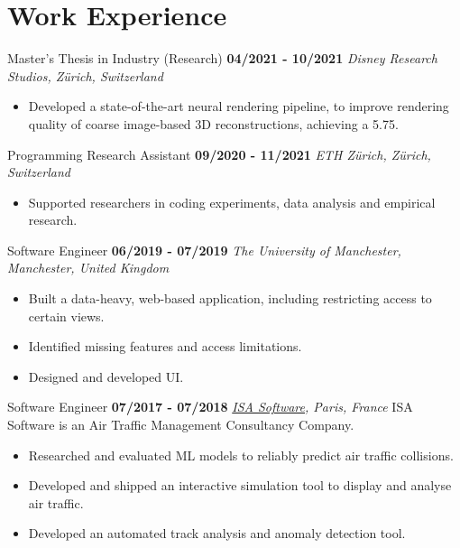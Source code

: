 \documentclass[]{friggeri-cv}
\begin{document}
\section{\color{red}Work \color{gray} Experience}
\begin{entrylist}
  \entry
    {}
    {\large{Master's Thesis in Industry (Research)}}
    {\textbf{04/2021 - 10/2021}}
    {\large\emph{{Disney Research Studios}, Zürich, Switzerland}}
    \vspace{-4mm}
    \begin{itemize}
        \item Developed a state-of-the-art neural rendering pipeline, to improve rendering quality of coarse image-based 3D reconstructions, achieving a 5.75.
    \end{itemize}
\end{entrylist}
\smallskip
\begin{entrylist}
  \entry
    {}
    {\large{Programming Research Assistant}}
    {\textbf{09/2020 - 11/2021}}
    {\large\emph{{ETH Zürich}, Zürich, Switzerland}}
    \vspace{-4mm}
    \begin{itemize}
        \item Supported researchers in coding experiments, data analysis and empirical research.
    \end{itemize}
\end{entrylist}
\smallskip
\begin{entrylist}
  \entry
    {}
    {\large{Software Engineer}}
    {\textbf{06/2019 - 07/2019}}
    {\large\emph{{The University of Manchester}, Manchester, United Kingdom}}
    \vspace{-4mm}
    \begin{itemize}
        \item Built a data-heavy, web-based application, including restricting access to certain views.
        \item Identified missing features and access limitations.
        \item Designed and developed UI.
    \end{itemize}
\end{entrylist}
\smallskip
\begin{entrylist}
  \entry
    {}
    {\large{Software Engineer}}
    {\textbf{07/2017 - 07/2018}}
    {\large\emph{\href{https://www.isa-software.com}{ISA Software}, Paris, France}}
    ISA Software is an Air Traffic Management Consultancy Company.
    \begin{itemize}[topsep=0pt]
        \item Researched and evaluated ML models to reliably predict air traffic collisions.
        \item Developed and shipped an interactive simulation tool to display and analyse air traffic.
        \item Developed an automated track analysis and anomaly detection tool.
    \end{itemize}
\end{entrylist}
\end{document}
